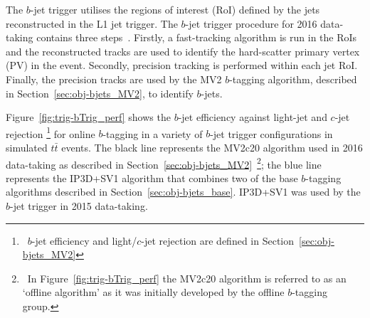 The $b$-jet trigger utilises the regions of interest (RoI) defined by the jets reconstructed in the L1 jet trigger.
The $b$-jet trigger procedure for 2016 data-taking contains three steps~\cite{trig-bTrig_desc}.
Firstly, a fast-tracking algorithm is run in the RoIs and
the reconstructed tracks are used to identify the hard-scatter primary vertex (PV) in the event.
Secondly, precision tracking is performed within each jet RoI.
Finally, the precision tracks are used by the MV2 $b$-tagging algorithm, described in Section~\ref{sec:obj-bjets_MV2}, to identify $b$-jets.

Figure~\ref{fig:trig-bTrig_perf} shows the $b$-jet efficiency against light-jet and $c$-jet rejection \footnote{\ $b$-jet efficiency and
  light/$c$-jet rejection are defined in Section~\ref{sec:obj-bjets_MV2}}
for online $b$-tagging in a variety of $b$-jet trigger configurations in simulated $t\bar{t}$ events.
The black line represents the MV2c20 algorithm used in 2016 data-taking as described in Section~\ref{sec:obj-bjets_MV2}~\footnote{\ In
Figure~\ref{fig:trig-bTrig_perf} the MV2c20 algorithm is referred to as an `offline algorithm' as it was initially developed by the offline $b$-tagging group.};
the blue line represents the IP3D+SV1 algorithm that combines two of the base $b$-tagging algorithms described in Section~\ref{sec:obj-bjets_base}.
IP3D+SV1 was used by the $b$-jet trigger in 2015 data-taking.

